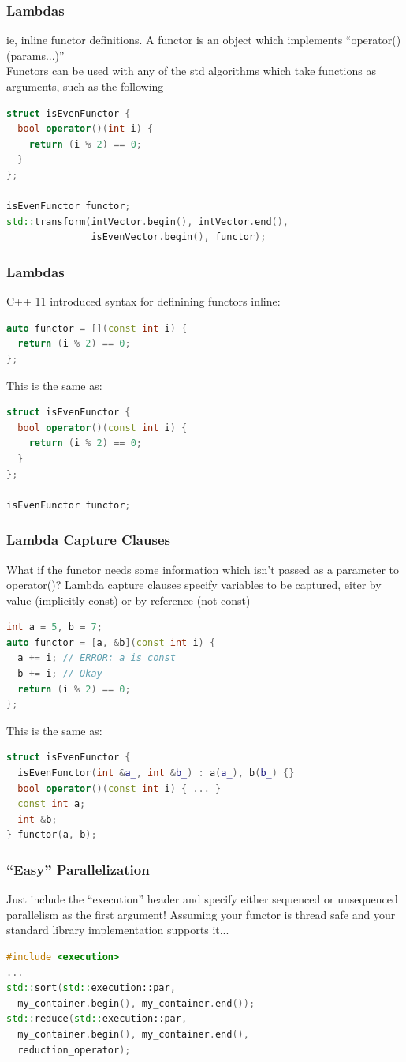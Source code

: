 \documentclass{beamer}
\begin{document}
\begin{frame}[fragile]
  \frametitle{Lambdas}
  ie, inline functor definitions. A functor is an object which implements ``operator()(params...)''\\
  Functors can be used with any of the std algorithms which take functions as arguments, such as the following

  \begin{lstlisting}[language=C++]
struct isEvenFunctor {
  bool operator()(int i) {
    return (i % 2) == 0;
  }
};

isEvenFunctor functor;
std::transform(intVector.begin(), intVector.end(),
               isEvenVector.begin(), functor);
  \end{lstlisting}
\end{frame}

\begin{frame}[fragile]
  \frametitle{Lambdas}
  C++ 11 introduced syntax for definining functors inline:
  \begin{lstlisting}[language=C++]
auto functor = [](const int i) {
  return (i % 2) == 0;
};
  \end{lstlisting}
This is the same as:
  \begin{lstlisting}[language=C++]
struct isEvenFunctor {
  bool operator()(const int i) {
    return (i % 2) == 0;
  }
};

isEvenFunctor functor;
  \end{lstlisting}
\end{frame}

\begin{frame}[fragile]
  \frametitle{Lambda Capture Clauses}
  What if the functor needs some information which isn't passed as a parameter to operator()?
  Lambda capture clauses specify variables to be captured, eiter by value (implicitly const)
  or by reference (not const)
  \begin{lstlisting}[language=C++]
int a = 5, b = 7;
auto functor = [a, &b](const int i) {
  a += i; // ERROR: a is const
  b += i; // Okay
  return (i % 2) == 0;
};
  \end{lstlisting}
This is the same as:
  \begin{lstlisting}[language=C++]
struct isEvenFunctor {
  isEvenFunctor(int &a_, int &b_) : a(a_), b(b_) {}
  bool operator()(const int i) { ... }
  const int a;
  int &b;
} functor(a, b);
  \end{lstlisting}
\end{frame}

\begin{frame}[fragile]
  \frametitle{``Easy'' Parallelization}
  Just include the ``execution'' header and specify either sequenced or unsequenced parallelism
  as the first argument!
  Assuming your functor is thread safe and your standard library implementation supports it...
  \begin{lstlisting}[language=C++]
#include <execution>
...
std::sort(std::execution::par,
  my_container.begin(), my_container.end());
std::reduce(std::execution::par,
  my_container.begin(), my_container.end(),
  reduction_operator);
  \end{lstlisting}
\end{frame}
\end{document}
